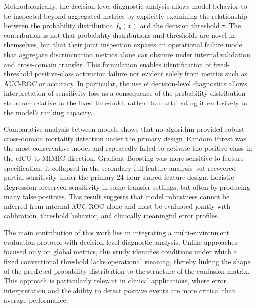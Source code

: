 \documentclass[utf8]{FrontiersinHarvard} %
\begin{document}
Methodologically, the decision-level diagnostic analysis allows model behavior to be inspected beyond aggregated metrics by explicitly examining the relationship between the probability distribution $f_{\theta}(x)$ and the decision threshold $\tau$. The contribution is not that probability distributions and thresholds are novel in themselves, but that their joint inspection exposes an operational failure mode that aggregate discrimination metrics alone can obscure under internal validation and cross-domain transfer. This formulation enables identification of fixed-threshold positive-class activation failure not evident solely from metrics such as AUC-ROC or accuracy. In particular, the use of decision-level diagnostics allows interpretation of sensitivity loss as a consequence of the probability distribution structure relative to the fixed threshold, rather than attributing it exclusively to the model's ranking capacity.

Comparative analysis between models shows that no algorithm provided robust cross-domain mortality detection under the primary design. Random Forest was the most conservative model and repeatedly failed to activate the positive class in the eICU-to-MIMIC direction. Gradient Boosting was more sensitive to feature specification: it collapsed in the secondary full-feature analysis but recovered partial sensitivity under the primary 24-hour shared-feature design. Logistic Regression preserved sensitivity in some transfer settings, but often by producing many false positives. This result suggests that model robustness cannot be inferred from internal AUC-ROC alone and must be evaluated jointly with calibration, threshold behavior, and clinically meaningful error profiles.

The main contribution of this work lies in integrating a multi-environment evaluation protocol with decision-level diagnostic analysis. Unlike approaches focused only on global metrics, this study identifies conditions under which a fixed conventional threshold lacks operational meaning, thereby linking the shape of the predicted-probability distribution to the structure of the confusion matrix. This approach is particularly relevant in clinical applications, where error interpretation and the ability to detect positive events are more critical than average performance.
\end{document}
